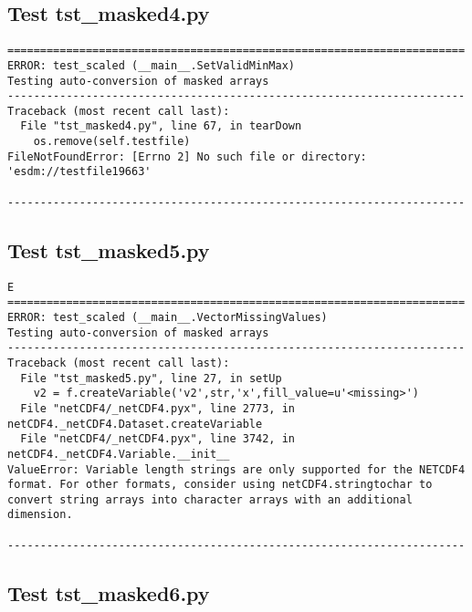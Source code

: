 \subsection{Test tst\_masked4.py}

\begin{verbatim}
======================================================================
ERROR: test_scaled (__main__.SetValidMinMax)
Testing auto-conversion of masked arrays
----------------------------------------------------------------------
Traceback (most recent call last):
  File "tst_masked4.py", line 67, in tearDown
    os.remove(self.testfile)
FileNotFoundError: [Errno 2] No such file or directory: 'esdm://testfile19663'

----------------------------------------------------------------------
\end{verbatim}

\subsection{Test tst\_masked5.py}

\begin{verbatim}
E
======================================================================
ERROR: test_scaled (__main__.VectorMissingValues)
Testing auto-conversion of masked arrays
----------------------------------------------------------------------
Traceback (most recent call last):
  File "tst_masked5.py", line 27, in setUp
    v2 = f.createVariable('v2',str,'x',fill_value=u'<missing>')
  File "netCDF4/_netCDF4.pyx", line 2773, in netCDF4._netCDF4.Dataset.createVariable
  File "netCDF4/_netCDF4.pyx", line 3742, in netCDF4._netCDF4.Variable.__init__
ValueError: Variable length strings are only supported for the NETCDF4 format. For other formats, consider using netCDF4.stringtochar to convert string arrays into character arrays with an additional dimension.

----------------------------------------------------------------------
\end{verbatim}

\subsection{Test tst\_masked6.py}

